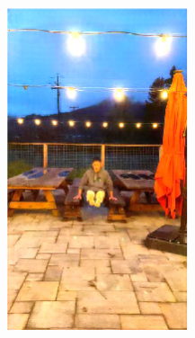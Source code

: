 \documentclass[letterpaper,12pt]{article}
\begin{document}
\begin{figure}[htbp]
\begin{subfigure}{0.128\textwidth}
			\includegraphics[width=\linewidth]{LoLi-Phone-imgT_1/DSLR}
			\captionsetup{font=scriptsize}
			\caption{}
			\label{fig: LoLi-Phone-imgT_1_i}  
		\end{subfigure}
		\begin{subfigure}{0.128\textwidth}

\end{subfigure}
\end{figure}
\end{document}

